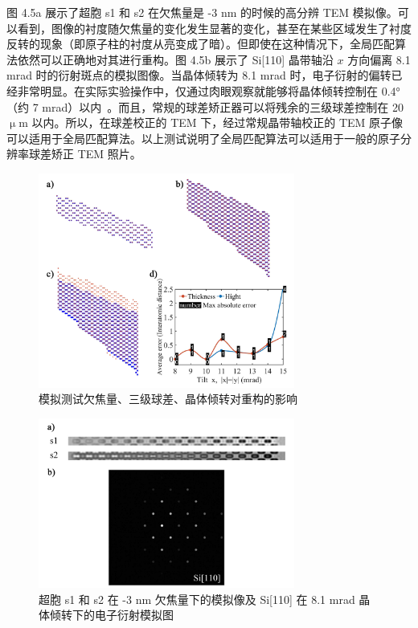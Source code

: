 图 4.5a 展示了超胞 s1 和 s2 在欠焦量是 -3 nm 的时候的高分辨 TEM 模拟像。可以看到，图像的衬度随欠焦量的变化发生显著的变化，甚至在某些区域发生了衬度反转的现象（即原子柱的衬度从亮变成了暗）。但即使在这种情况下，全局匹配算法依然可以正确地对其进行重构。图 4.5b 展示了 Si[110] 晶带轴沿 $x$ 方向偏离 8.1 mrad 时的衍射斑点的模拟图像。当晶体倾转为 8.1 mrad 时，电子衍射的偏转已经非常明显。在实际实验操作中，仅通过肉眼观察就能够将晶体倾转控制在 0.4°（约 7 mrad）以内~\cite{Jansen2013}。而且，常规的球差矫正器可以将残余的三级球差控制在 20 $\upmu$m 以内。所以，在球差校正的 TEM 下，经过常规晶带轴校正的 TEM 原子像可以适用于全局匹配算法。以上测试说明了全局匹配算法可以适用于一般的原子分辨率球差矫正 TEM 照片。
\begin{figure}[H]
	\vspace{\baselineskip}
	\centering
	\includegraphics[width=0.75\textwidth]{../2.3/23}
	\caption{模拟测试欠焦量、三级球差、晶体倾转对重构的影响}\label{fig:23}
	\song{}
\end{figure}
\begin{figure}[H]
	\vspace{\baselineskip}
	\centering
	\includegraphics[width=0.75\textwidth]{../2.4/24}
	\caption{超胞 s1 和 s2 在 -3 nm 欠焦量下的模拟像及 Si[110] 在 8.1 mrad 晶体倾转下的电子衍射模拟图}\label{fig:24}
	\song{}
\end{figure}

